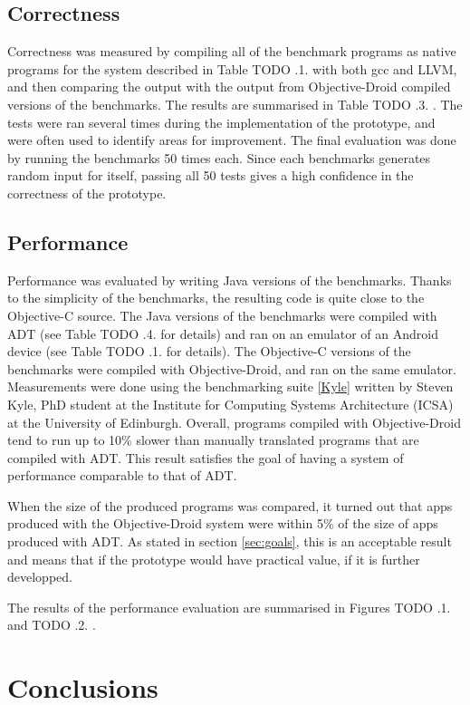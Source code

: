 \documentclass[parskip]{cs4rep}
\begin{document}
\section{Correctness}

Correctness was measured by compiling all of the benchmark programs as native programs for the system described in Table TODO .1. with both gcc and LLVM, and then comparing the output with the output from Objective-Droid compiled versions of the benchmarks. The results are summarised in Table TODO .3. . The tests were ran several times during the implementation of the prototype, and were often used to identify areas for improvement. The final evaluation was done by running the benchmarks 50 times each. Since each benchmarks generates random input for itself, passing all 50 tests gives a high confidence in the correctness of the prototype.

\section{Performance}

Performance was evaluated by writing Java versions of the benchmarks. Thanks to the simplicity of the benchmarks, the resulting code is quite close to the Objective-C source. The Java versions of the benchmarks were compiled with ADT (see Table TODO .4. for details) and ran on an emulator of an Android device (see Table TODO .1. for details). The Objective-C versions of the benchmarks were compiled with Objective-Droid, and ran on the same emulator. Measurements were done using the benchmarking suite \ref{Kyle} written by Steven Kyle, PhD student at the Institute for Computing Systems Architecture (ICSA) at the University of Edinburgh. Overall, programs compiled with Objective-Droid tend to run up to 10\% slower than manually translated programs that are compiled with ADT. This result satisfies the goal of having a system of performance comparable to that of ADT.

When the size of the produced programs was compared, it turned out that apps produced with the Objective-Droid system were within 5\% of the size of apps produced with ADT. As stated in section \ref{sec:goals}, this is an acceptable result and means that if the prototype would have practical value, if it is further developped.

The results of the performance evaluation are summarised in Figures TODO .1. and TODO .2. .

\chapter{Conclusions}
\end{document}
